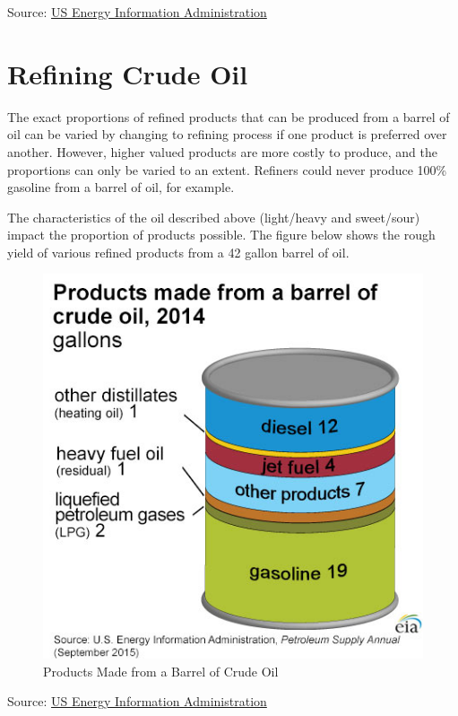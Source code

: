 \documentclass[]{book}
\theoremstyle{definition}
\theoremstyle{definition}
\theoremstyle{remark}
\begin{document}
Source:
\href{http://www.eia.gov/Energyexplained/index.cfm?page=oil_home}{US
Energy Information Administration}

\section{Refining Crude Oil}\label{refining-crude-oil}

The exact proportions of refined products that can be produced from a
barrel of oil can be varied by changing to refining process if one
product is preferred over another. However, higher valued products are
more costly to produce, and the proportions can only be varied to an
extent. Refiners could never produce 100\% gasoline from a barrel of
oil, for example.

The characteristics of the oil described above (light/heavy and
sweet/sour) impact the proportion of products possible. The figure below
shows the rough yield of various refined products from a 42 gallon
barrel of oil.

\begin{figure}[htbp]
\centering
\includegraphics{images/products_from_barrel_crude_oil-large.jpg}
\caption{Products Made from a Barrel of Crude Oil}
\end{figure}

Source:
\href{http://www.eia.gov/Energyexplained/index.cfm?page=oil_home}{US
Energy Information Administration}
\end{document}
